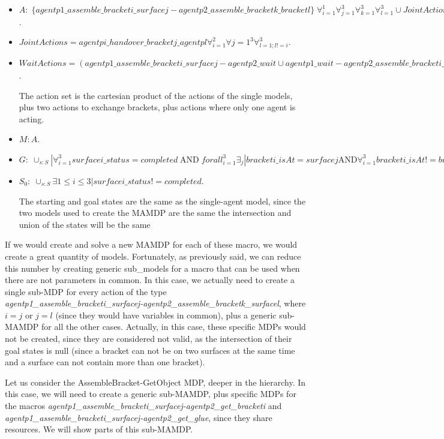 \begin{itemize}
	\item $A:\;\{agentp1\_assemble\_bracketi\_surfacej-agentp2\_assemble\_bracketk\_bracketl\}\;\forall_{i=1}^1 \forall_{j=1}^3
	\forall_{k=1}^3 \forall_{l=1}^3 \cup JointActions \cup WaitActions$.
	\item $JointActions=agentpi\_handover\_bracketj\_agentpl \forall_{i=1}^2 \forall{j=1}^3 \forall_{l=1; l!=i}^3$.
	\item $WaitActions=(agentp1\_assemble\_bracketi\_surfacej-agentp2\_wait \cup agentp1\_wait-agentp2\_assemble\_bracketi\_surfacej) \forall_{i=1}^3 \forall_{j=1}^3$.

	The action set is the cartesian product of the actions of the single models, plus two actions to exchange brackets, plus actions where only one agent is acting.
	\item $M: A$.
	\item $G:\; \cup_{s:S} | \forall_{i=1}^3 surfacei\_status=completed\;\text{AND}\;forall_{i=1}^3\exists_{j}|bracketi\_isAt=surfacej \text{AND} \forall_{i=1}^3 bracketi\_isAt!=bracketj\_isAt.$
	\item $S_0:\; \cup_{s:S} \exists{1\leq i \leq 3} | surfacei\_status!=completed$.

	The starting and goal states are the same as the single-agent model, since the two models used to create the MAMDP are the same the intersection and union of the states will be the same
\end{itemize}


If we would create and solve a new MAMDP for each of these macro, we would create a great quantity of models. Fortunately, as previously said, we can reduce this number by creating generic sub_models for a macro that can be used when there are not parameters in common. In this case, we actually need to create a single sub-MDP for every action of the type \textit{agentp1\_assemble\_bracketi\_surfacej-agentp2\_assemble\_bracketk\_surfacel}, where $i=j$ or $j=l$ (since they would have variables in common), plus a generic sub-MAMDP for all the other cases. Actually, in this case, these specific MDPs would not be created, since they are considered not valid, as the intersection of their goal states is null (since a bracket can not be on two surfaces at the same time and a surface can not contain more than one bracket).

Let us consider the AssembleBracket-GetObject MDP, deeper in the hierarchy. In this case, we will need to create a generic sub-MAMDP, plus specific MDPs for the macros \textit{agentp1\_assemble\_bracketi\_surfacej-agentp2\_get\_bracketi} and \textit{agentp1\_assemble\_bracketi\_surfacej-agentp2\_get\_glue}, since they share resources. We will show parts of this sub-MAMDP.  

